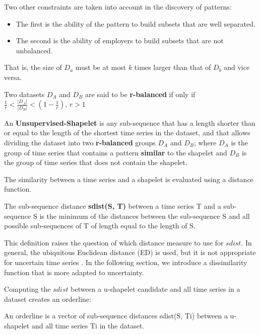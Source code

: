Two other constraints are taken into account in the discovery of patterns: 


\begin{itemize}
\item The first is the ability of the pattern to build subsets that are well separated.
\item The second is the ability of employers to build subsets that are not unbalanced.
\end{itemize}

 That is, the size of $D_a$ must be at most $k$ times larger than that of $D_b$ and vice versa.

\begin{definition}
Two datasets  $D_A$ and $D_B$ are said to be \textbf{r-balanced} if only if \\
$\frac{1}{r}<\frac{|D_{A}|}{|D_{B}|}<(1-\frac{1}{r}),\,r>1$
\end{definition}


\begin{definition}
An \textbf{Unsupervised-Shapelet} is any sub-sequence that has a length shorter than or equal to the length of the shortest time series in the dataset, and that allows dividing the dataset into two
\textbf{r-balanced} groups $D_A$ and $D_B$; where $D_A$ is the group of time series that contains a pattern \textbf{similar} to the shapelet and $D_B$ is the group of
time series that does not contain the shapelet.
\end{definition}

The similarity between a time series and a shapelet is evaluated using a distance function.


\begin{definition}
The sub-sequence distance \textbf{sdist(S, T)} between
a time series T and a sub-sequence S is the minimum of the
distances between the sub-sequence S and all possible
sub-sequences of T of length equal to the length of S.
\end{definition}
This definition raises the question of which distance measure to use for $sdist$.
In general, the ubiquitous Euclidean distance (ED) is used, but it is not
appropriate for uncertain time series \cite{Orang2014}. In the following section, we introduce a
dissimilarity function that is more adapted to  uncertainty.   


Computing the $sdist$ between a u-shapelet candidate
and all time series in a dataset creates an orderline:


\begin{definition}
An orderline is a vector of sub-sequence
distances sdist(S, Ti) between a u-shapelet and all time series Ti in the dataset.
\end{definition}


